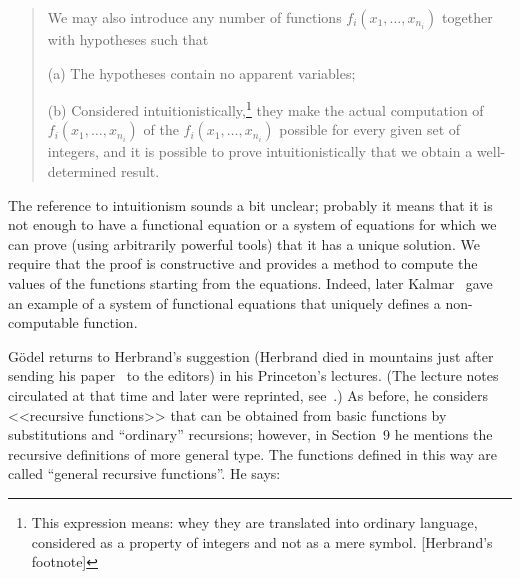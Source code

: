 \documentclass[12pt]{article}
\theoremstyle{remark}
\begin{document}
\begin{quote}
We may also introduce any number of functions $f_i(x_1,\ldots,x_{n_i})$ together with hypotheses such that
\begin{description}
\item{(a)} The hypotheses contain no apparent variables;
\item{(b)} Considered intuitionistically,\footnote{This expression means: whey they are translated into ordinary language, considered as a property of integers and not as a mere symbol. [Herbrand's footnote]} they make the actual computation of $f_i(x_1,\ldots,x_{n_i})$ of the $f_i(x_1,\ldots,x_{n_i})$ possible for every given set of integers, and it is possible to prove intuitionistically that we obtain a well-determined result.
\end{description}
\end{quote} 

The reference to intuitionism sounds a bit unclear; probably it means that it is not enough to have a functional equation or a system of equations for which we can prove (using arbitrarily powerful tools) that it has a unique solution. We require that the proof is constructive and provides a method to compute the values of the functions starting from the equations. Indeed, later Kalmar~\cite{Kalmar1955} gave an example of a system of functional equations that uniquely defines a non-computable function.
 
G\"{o}del returns to Herbrand's suggestion (Herbrand died in mountains just after sending his paper~\cite{Herbrand1932} to the editors) in his Princeton's lectures. (The lecture notes circulated at that time and later were reprinted, see~\cite{Herbrand1932}.) As before, he considers <<recursive functions>> that can be obtained from basic functions by substitutions and ``ordinary'' recursions; however, in Section~9 he mentions the recursive definitions of more general type. The functions defined in this way are called ``general recursive functions''. He says:
\end{document}
